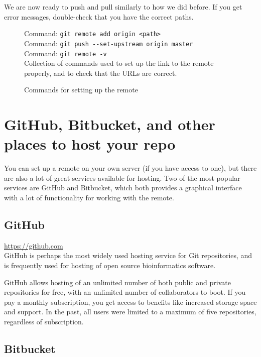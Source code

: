 \documentclass[../main/git_course_main.tex]{subfiles}
\begin{document}
We are now ready to push and pull similarly to how we did before.
If you get error messages, double-check that you have the correct paths.

\begin{figure}[h!]
\begin{bluebox}
Command: \verb$git remote add origin <path>$ \\
Command: \verb$git push --set-upstream origin master$ \\
Command: \verb$git remote -v$ \\

Collection of commands used to set up the link to the remote properly,
and to check that the URLs are correct.
\end{bluebox}
\label{command:pull}
\caption{Commands for setting up the remote}
\end{figure}

\section{GitHub, Bitbucket, and other places to host your repo}

You can set up a remote on your own server (if you have access to one), but there are also
a lot of great services available for hosting. Two of the most popular services are GitHub and Bitbucket, which both provides a graphical interface with a lot of functionality for working with the remote.

\subsection{GitHub}

\url{https://github.com} \\

GitHub is perhaps the most widely used hosting service for Git repositories, and is frequently used for hosting of open source bioinformatics software. 

GitHub allows hosting of an unlimited number of both public and private repositories for free, with an unlimited number of collaborators to boot. If you pay a monthly subscription, you get access to benefits like increased storage space and support. In the past, all users were limited to a maximum of five repositories, regardless of subscription.

\subsection{Bitbucket}
\end{document}
